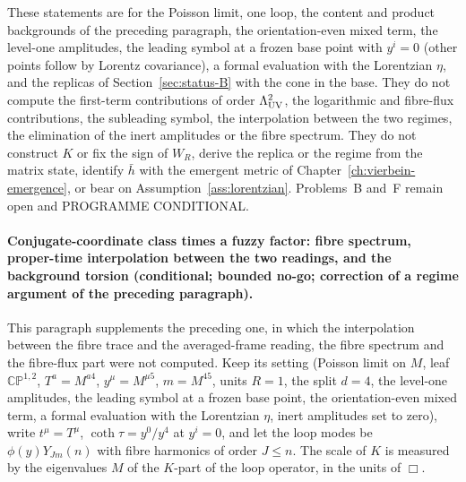 These statements are for the Poisson limit, one loop, the content and product backgrounds of the preceding paragraph, the orientation-even mixed term, the level-one amplitudes, the leading symbol at a frozen base point with \(y^i=0\) (other points follow by Lorentz covariance), a formal evaluation with the Lorentzian \(\eta\), and the replicas of Section~\ref{sec:status-B} with the cone in the base. They do not compute the first-term contributions of order \(\Lambda_{\mathrm{UV}}^2\), the logarithmic and fibre-flux contributions, the subleading symbol, the interpolation between the two regimes, the elimination of the inert amplitudes or the fibre spectrum. They do not construct \(K\) or fix the sign of \(W_R\), derive the replica or the regime from the matrix state, identify \(\bar h\) with the emergent metric of Chapter~\ref{ch:vierbein-emergence}, or bear on Assumption~\ref{ass:lorentzian}. Problems~B and~F remain open and PROGRAMME CONDITIONAL.

\paragraph{Conjugate-coordinate class times a fuzzy factor: fibre spectrum, proper-time interpolation between the two readings, and the background torsion (conditional; bounded no-go; correction of a regime argument of the preceding paragraph).}
This paragraph supplements the preceding one, in which the interpolation between the fibre trace and the averaged-frame reading, the fibre spectrum and the fibre-flux part were not computed. Keep its setting (Poisson limit on \(M\), leaf \(\mathbb{CP}^{1,2}\), \(T^a=M^{a4}\), \(y^\mu=M^{\mu5}\), \(m=M^{45}\), units \(R=1\), the split \(d=4\), the level-one amplitudes, the leading symbol at a frozen base point, the orientation-even mixed term, a formal evaluation with the Lorentzian \(\eta\), inert amplitudes set to zero), write \(t^\mu=T^\mu\), \(\coth\tau=y^0/y^4\) at \(y^i=0\), and let the loop modes be \(\phi(y)Y_{Jm}(n)\) with fibre harmonics of order \(J\le n\). The scale of \(K\) is measured by the eigenvalues \(M\) of the \(K\)-part of the loop operator, in the units of \(\Box\).

